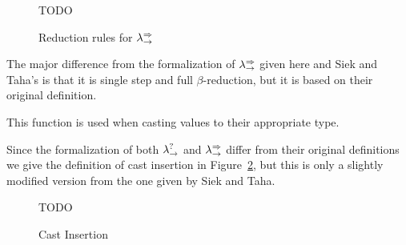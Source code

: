 \renewcommand{\GSiekdrulerdAXXvaluesName}{\text{values}}
\renewcommand{\GSiekdrulerdAXXcastIdName}{}
\renewcommand{\GSiekdrulerdAXXcastUName}{}
\renewcommand{\GSiekdrulerdAXXsucceedName}{}
\renewcommand{\GSiekdrulerdAXXcastArrowName}{}
\renewcommand{\GSiekdrulerdAXXcastGroundName}{}
\renewcommand{\GSiekdrulerdAXXcastExpandName}{}
\renewcommand{\GSiekdrulerdAXXbetaName}{}
\renewcommand{\GSiekdrulerdAXXappOneName}{}
\renewcommand{\GSiekdrulerdAXXappTwoName}{}
\renewcommand{\GSiekdrulerdAXXfstName}{}
\renewcommand{\GSiekdrulerdAXXsndName}{}
\renewcommand{\GSiekdrulerdAXXpairOneName}{}
\renewcommand{\GSiekdrulerdAXXpairTwoName}{}
\begin{figure}
  TODO
  \caption{Reduction rules for $\lambda^{\Rightarrow}_\to$}
  \label{fig:annotated-reduction}
\end{figure}

The major difference from the formalization of $\lambda^{\Rightarrow}_\to$ given here
and Siek and Taha's is that it is single step and full
$\beta$-reduction, but it is based on their original definition.

This function is used when casting values to their appropriate type.

Since the formalization of both $\lambda^?_\to$ and $\lambda^{\Rightarrow}_\to$ differ
from their original definitions we give the definition of cast
insertion in Figure~\ref{fig:cast-insert}, but this is only a slightly
modified version from the one given by Siek and Taha.
\begin{figure}
  TODO
  \caption{Cast Insertion}
  \label{fig:cast-insert}
\end{figure}


